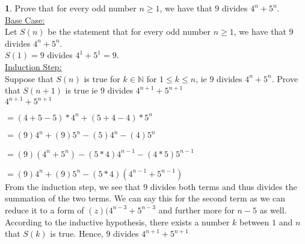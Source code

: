 \documentclass[12pt,a4paper]{article}
\newcommand{\N}{\mathbb{N}}
\theoremstyle{definition}
\newtheorem{problem}{}
\begin{document}
\begin{problem}
Prove that for every odd number $n\geq 1$, we have that $9$ divides $4^n+5^n$. \\

\underline{Base Case:} \\
Let $S(n)$ be the statement that for every odd number $n\geq 1$, we have that $9$ divides $4^n+5^n$.\\
$S(1) = 9$ divides $4^1+5^1 = 9$. \\

\underline{Induction Step:} \\
Suppose that $S(n)$ is true for $k \in \N$ for $1 \leq k \leq n$, ie $9$ divides $4^n + 5^n$. Prove that $S(n + 1)$ is true ie $9$ divides $4^{n + 1} + 5^{n + 1}$ \\

$4^{n+1} + 5^{n + 1}$

$= (4 + 5 - 5)*4^n + (5 + 4 - 4)*5^n$

$= (9)4^n + (9)5^n - (5)4^n - (4)5^n$

$= (9)(4^n + 5^n) - (5*4)4^{n - 1} - (4*5)5^{n - 1}$

$= (9)4^n + (9)5^n - (5*4)(4^{n - 1} + 5^{n - 1})$ \\

From the induction step, we see that $9$ divides both terms and thus divides the summation of the two terms. We can say this for the second term as we can reduce it to a form of $(z)(4^{n - 3} + 5^{n - 3}$ and further more for $n - 5$ as well. According to the inductive hypothesis, there exists a number $k$ between $1$ and $n$ that $S(k)$ is true. Hence, $9$ divides $4^{n + 1} + 5^{n + 1}$ \\

\end{problem}
\end{document}

